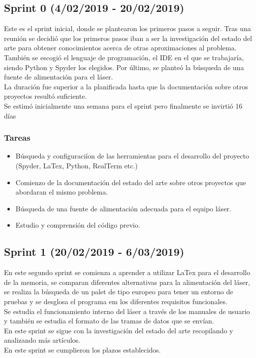 \subsection{Sprint 0 (4/02/2019 - 20/02/2019)}
Este es el sprint inicial, donde se plantearon los primeros pasos a seguir. Tras una reunión se decidió que los primeros pasos iban a ser la investigación del estado del arte para obtener conocimientos acerca de otras aproximaciones al problema. También se escogió el lenguaje de programación, el IDE en el que se trabajaría, siendo Python y Spyder los elegidos. Por último, se planteó la búsqueda de una fuente de alimentación para el láser.\\ La duración fue superior a la planificada hasta que la documentación sobre otros proyectos resultó suficiente.\\ Se estimó inicialmente una semana para el sprint pero finalmente se invirtió 16 días

\subsubsection{Tareas}
\begin{itemize}
\item Búsqueda y configuraciíon de las herramientas para el desarrollo del proyecto (Spyder, LaTex, Python, RealTerm etc.)
\item Comienzo de la documentación del estado del arte sobre otros proyectos que abordaran el mismo problema.
\item Búsqueda de una fuente de alimentación adecuada para el equipo láser.
\item Estudio y comprensión del código previo.
\end{itemize}



\subsection{Sprint 1 (20/02/2019 - 6/03/2019)}
En este segundo sprint se comienza a aprender a utilizar LaTex para el desarrollo de la memoria, se comparan diferentes alternativas para la alimentación del láser, se realiza la búsqueda de un palet de tipo europeo para tener un entorno de pruebas y se desglosa el programa em los diferentes requisitos funcionales.\\ Se estudia el funcionamiento interno del láser a través de los manuales de usuario y también se estudia el formato de las tramas de datos que se envían. \\En este sprint se sigue con la investigación del estado del arte recopilando y analizando más artículos.\\En este sprint se cumplieron los plazos establecidos.
